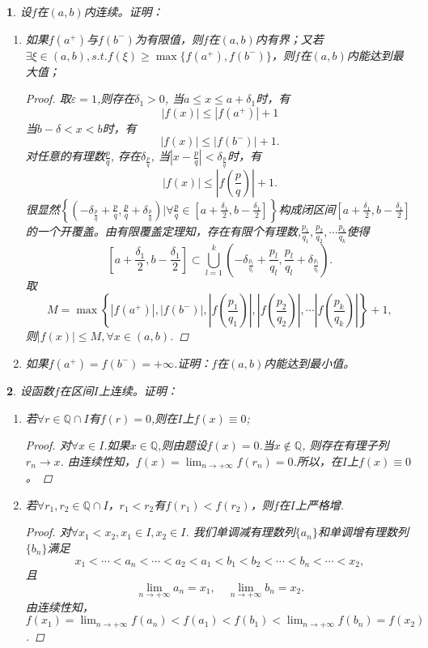\documentclass[utf8]{book}
\newtheorem{example}{}[section]             %
\begin{document}
\begin{example}
设$f$在$(a,b)$内连续。证明：
\renewcommand\labelenumi{\normalfont(\theenumi)}
\begin{enumerate}
\item 如果$f(a^+)$与$f(b^-)$为有限值，则$f$在$(a,b)$内有界；又若$\exists \xi\in(a,b), s.t.f(\xi)\geq \max\{f(a^+), f(b^-)\}$，则$f$在$(a,b)$内能达到最大值；
\begin{proof}取$\varepsilon = 1$,则存在$\delta_1 > 0$, 当$a \leq x \leq a+\delta_1$时，有
$$|f(x)| \leq |f(a^+)| +1$$
当$b-\delta < x < b$时，有
$$|f(x)| \leq |f(b^-)|+ 1.$$
对任意的有理数$\frac{p}{q}$, 存在$\delta_{\frac{p}{q}}$, 当$|x-\frac{p}{q}| < \delta_{\frac{p}{q}}$时，有
$$|f(x)|\leq \left|f\left(\frac{p}{q}\right)\right| + 1.$$
很显然$\left\{(-\delta_{\frac{p}{q}}+\frac{p}{q},\frac{p}{q}+\delta_{\frac{p}{q}})\Bigg|\forall \frac{p}{q}\in [a+\frac{\delta_1}{2}, b-\frac{\delta_1}{2}]\right\}$构成闭区间$[a+\frac{\delta_1}{2}, b-\frac{\delta_1}{2}]$的一个开覆盖。由有限覆盖定理知，存在有限个有理数,$\frac{p_1}{q_1}, \frac{p_2}{q_2},\cdots \frac{p_k}{q_k}$使得
$$[a+\frac{\delta_1}{2}, b-\frac{\delta_1}{2}]\subset\bigcup_{l=1}^k(-\delta_{\frac{p_l}{q_l}}+\frac{p_l}{q_l},\frac{p_l}{q_l}+\delta_{\frac{p_l}{q_l}}).$$
取$$M=\max\left\{\left|f(a^+)\right|,\left|f(b^-)\right|, \left|f\left(\frac{p_1}{q_1}\right)\right|, \left|f\left(\frac{p_2}{q_2}\right)\right|,\cdots \left|f\left(\frac{p_k}{q_k}\right)\right|\right\}+1,$$
则$|f(x)| \leq  M, \forall x\in(a,b)$.
\end{proof}
\item 如果$f(a^+)=f(b^-)=+\infty$.证明：$f$在$(a,b)$内能达到最小值。
\end{enumerate}
\end{example}
\begin{example}
设函数$f$在区间$I$上连续。证明：
\renewcommand\labelenumi{\normalfont(\theenumi)}
\begin{enumerate}
\item 若$\forall r\in \mathbb{Q}\cap I$有$f(r) = 0$,则在$I$上$f(x)\equiv 0$;
\begin{proof}对$\forall x\in I$.如果$x\in \mathbb{Q}$,则由题设$f(x) = 0$.当$x\notin \mathbb{Q}$, 则存在有理子列$r_n\to x$. 由连续性知，$f(x) = \displaystyle\lim_{n\to +\infty}f(r_n) = 0$.所以，在$I$上$f(x)\equiv 0$。
\end{proof}
\item 若$\forall r_1,r_2\in\mathbb{Q}\cap I$，$r_1<r_2$有$f(r_1) < f(r_2)$，则$f$在$I$上严格增.
\begin{proof}对$\forall x_1 < x_2, x_1\in I, x_2\in I$. 我们单调减有理数列$\{a_n\}$和单调增有理数列$\{b_n\}$满足
$$x_1 < \cdots < a_n <\cdots < a_2 < a_1 < b_1 < b_2 < \cdots < b_n < \cdots < x_2,$$
且$$\displaystyle\lim_{n\to +\infty}a_n = x_1,\quad \displaystyle\lim_{n\to +\infty}b_n = x_2.$$
由连续性知，$f(x_1) = \displaystyle\lim_{n\to +\infty}f(a_n) < f(a_1) < f(b_1) < \displaystyle\lim_{n\to +\infty}f(b_n)=f(x_2)$.
\end{proof}
\end{enumerate}
\end{example}
\end{document}
